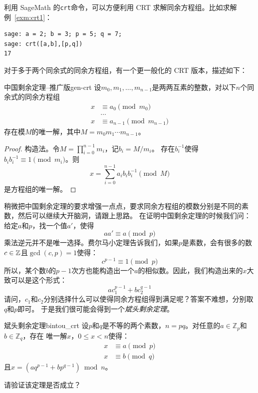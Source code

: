\begin{example}
\label{exm:crt2}
利用 SageMath 的\lstinline|crt|命令，可以方便利用 CRT 求解同余方程组。比如求解例~\ref{exm:crt1}：
\begin{lstlisting}
sage: a = 2; b = 3; p = 5; q = 7;
sage: crt([a,b],[p,q])
17
\end{lstlisting}
\end{example}
对于多于两个同余式的同余方程组，有一个更一般化的 CRT 版本，描述如下：
\begin{theorem}{中国剩余定理--推广版}{gen-crt}
设$m_0, m_1, \ldots, m_{n-1}$是两两互素的整数，对以下$n$个同余式的同余方程组
	\begin{align*}
	  x &\equiv  a_0 \pmod{m_0}\\
	  &\ldots \\
	  x &\equiv a_{n-1} \pmod{m_{n-1}}
	\end{align*}
存在模$M$的唯一解，其中$M = m_0 m_1 \cdots m_{n-1}$。
\end{theorem}	

\begin{proof}
		构造法。令$M= \prod_{i = 0}^{n-1} m_i$，记$b_i = M/m_i$。
		存在$b_i ^{-1}$使得$b_i b_i ^{-1}  \equiv 1 \pmod{m_i}$。则
		\[x = \sum_{i=0}^{n-1} a_i b_i b_i^{-1}\pmod{M}\]
是方程组的唯一解。
\end{proof}

稍微把中国剩余定理的要求增强一点点，要求同余方程组的模数分别是不同的素数，然后可以继续大开脑洞，请跟上思路。
在证明中国剩余定理的时候我们问：给定$a$和$p$，找一个值$a'$，使得
\[ a a' \equiv a \pmod{p}\]
乘法逆元并不是唯一选择。费尔马小定理告诉我们，如果$p$是素数，会有很多的数$c\in {\mathbb Z}$且$\gcd(c,p)=1$使得：
\[ c^{p-1} \equiv 1 \pmod{p}\]
所以，某个数$b$的$p-1$次方也能构造出一个$a$的相似数。因此，我们构造出来的$x$大致可以是这个形式：
\[ a c_1^{p-1} + bc_2^{q-1}\]
请问，$c_1$和$c_2$分别选择什么可以使得同余方程组得到满足呢？答案不难想，分别取$q$和$p$即可。
于是我们很可能会得到一个\emph{斌头剩余定理}。

\begin{theorem}{斌头剩余定理}{bintou_crt}
设$p$和$q$是不等的两个素数，$n = pq$。对任意的$a \in \mathbb{Z}_p$和$b \in \mathbb{Z}_q$，存在
唯一解$x$，$0 \leq x < n$使得：
\begin{align*}
x &\equiv a \pmod{p}\\
x &\equiv b \pmod{q}
\end{align*}
且$x = (a q^{p-1} + b p^{q-1}) \bmod n$。
\end{theorem}
请验证该定理是否成立？

